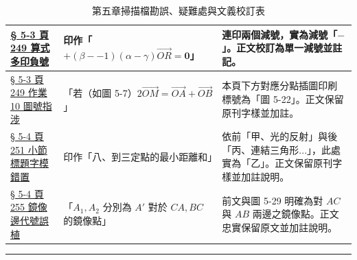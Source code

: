\documentclass[a4paper,12pt,twoside]{article}
\begin{document}
\begin{table}[H]
\begin{tabularx}{\textwidth}{|p{3.2cm}|p{3.8cm}|X|}
\hyperref[note:b3s-ch5-p249-double-minus]{§ 5-3 頁 249 算式多印負號} & 
印作「$+(\beta--1)(\alpha-\gamma)\vec{OR} = \mathbf{0}$」 & 
連印兩個減號，實為減號「$-$」。正文校訂為單一減號並註記。 \\ \hline

\hyperref[note:b3s-ch5-p249-fig-ref]{§ 5-3 頁 249 作業 10 圖號指涉} & 
「若（如圖 5-7）$2\vec{OM} = \vec{OA} + \vec{OB}$」 & 
本頁下方對應分點插圖印刷標號為「圖 5-22」。正文保留原刊字樣並加註。 \\ \hline

\hyperref[note:b3s-ch5-p251-sec-title]{§ 5-4 頁 251 小節標題字模錯置} & 
印作「八、到三定點的最小距離和」 & 
依前「甲、光的反射」與後「丙、連結三角形...」，此處實為「乙」。正文保留原刊字樣並加註說明。 \\ \hline

\hyperref[note:b3s-ch5-p255-mirror-line]{§ 5-4 頁 255 鏡像邊代號誤植} & 
「$A_1, A_2$ 分別為 $A'$ 對於 $CA, BC$ 的鏡像點」 & 
前文與圖 5-29 明確為對 $AC$ 與 $AB$ 兩邊之鏡像點。正文忠實保留原文並加註說明。 \\ \hline

\end{tabularx}
\caption{第五章掃描檔勘誤、疑難處與文義校訂表}
\label{tab:errata_b3_ch5}
\end{table}

\vspace{1em}
\hrule
\vspace{1em}

\tableofcontents
\newpage

\setcounter{section}{4}

\end{document}
